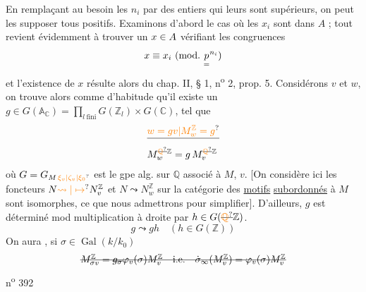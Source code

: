 En remplaçant au besoin les $n_i$ par des entiers qui leurs sont supérieurs, on peut les supposer tous positifs. Examinons d'abord le cas où les $x_i$ sont dans $A$ ; tout revient évidemment à trouver un $x\in A$ vérifiant les congruences
\[
x\handwritten{\equiv}x_i\ (\mathrm{mod.}\ \underset{=}{p}^{n_i})
\]
et l'existence de $x$ résulte alors du chap. II, § 1, n\textsuperscript{o} 2, prop. 5.
Considérons $v$ et $w$, on trouve alors  comme d'habitude qu'il existe un $g\in G(\mathbb A_{\mathbb C})=\prod_{l\ \mathrm{fini}}G(\mathbb Z_l)\times G(\mathbb C)$,
tel que
\[
\begin{aligned}
&\deleted{\unsure{w=g v|M_w^{\mathbb Z}=g}}\\
&M_w^{\deleted{\unsure{\mathbb Q}}\mathbb Z}=g\,M_v^{\deleted{\unsure{\mathbb Q}}\mathbb Z}
\end{aligned}
\]
où $G=G_{M\,\unsure{\xi_v|\zeta_v|\xi_0}}$ est le gpe alg. sur $\mathbb Q$ associé à $M$, $v$. [On considère ici les foncteurs $N\unsure{\leadsto|\mapsto}N_v^{\mathbb Z}$ et $N\leadsto N_w^{\mathbb Z}$ sur la catégorie des \uline{motifs} \uline{subordonnés} à $M$ sont isomorphes, ce que nous admettrons pour simplifier].
D'ailleurs, $g$ est déterminé mod multiplication à droite par $h\in G(\deleted{\unsure{\mathbb Q}}\mathbb Z)$.
\[
g\leadsto gh\quad(h\in G(\mathbb Z))
\]
 On aura , si $\sigma\in\operatorname{Gal}(k/k_0)$
\[
\deleted{M_{\sigma v}^{\mathbb Z}=\deleted{g_\sigma}\varphi_v(\sigma)M_v^{\mathbb Z}\quad\text{i.e.}\quad\dot{\sigma}_\infty(M_v^{\mathbb Z})=\varphi_v(\sigma)M_v^{\mathbb Z}}
\]
\hfill n\textsuperscript{o} 392

